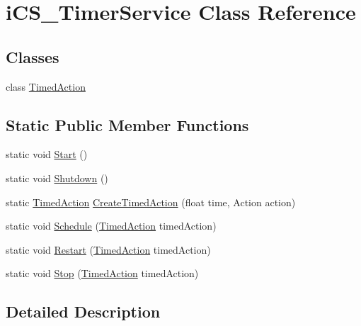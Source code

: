 \hypertarget{classi_c_s___timer_service}{\section{i\+C\+S\+\_\+\+Timer\+Service Class Reference}
\label{classi_c_s___timer_service}
}
\subsection*{Classes}
\begin{DoxyCompactItemize}
\item 
class \hyperlink{classi_c_s___timer_service_1_1_timed_action}{Timed\+Action}
\end{DoxyCompactItemize}
\subsection*{Static Public Member Functions}
\begin{DoxyCompactItemize}
\item 
static void \hyperlink{classi_c_s___timer_service_a401388ea3765b51bd0553c49f2018d63}{Start} ()
\item 
static void \hyperlink{classi_c_s___timer_service_ac7afb33bcb3018633ada0824ace149b5}{Shutdown} ()
\item 
static \hyperlink{classi_c_s___timer_service_1_1_timed_action}{Timed\+Action} \hyperlink{classi_c_s___timer_service_a5590d41b745856d82cdbb7a6853f533f}{Create\+Timed\+Action} (float time, Action action)
\item 
static void \hyperlink{classi_c_s___timer_service_a086fb5e6bae3b099e4a35f0516e394fc}{Schedule} (\hyperlink{classi_c_s___timer_service_1_1_timed_action}{Timed\+Action} timed\+Action)
\item 
static void \hyperlink{classi_c_s___timer_service_ab52f5cedae2940bb74bea2b8530dc550}{Restart} (\hyperlink{classi_c_s___timer_service_1_1_timed_action}{Timed\+Action} timed\+Action)
\item 
static void \hyperlink{classi_c_s___timer_service_ad7e23a24c562bbba797713be3963feaa}{Stop} (\hyperlink{classi_c_s___timer_service_1_1_timed_action}{Timed\+Action} timed\+Action)
\end{DoxyCompactItemize}


\subsection{Detailed Description}


